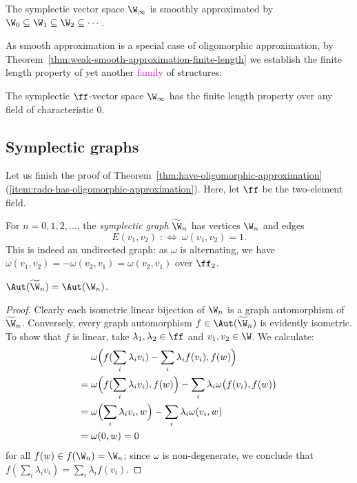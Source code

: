 \begin{theorem}\label{thm:symplectic-smooth-approximation}
    The symplectic vector space $\W_\infty$ is smoothly approximated by 
    $\W_0 \subseteq \W_1 \subseteq \W_2 \subseteq \cdots$.
\end{theorem}

As smooth approximation is a special case of oligomorphic approximation, 
by Theorem~\ref{thm:weak-smooth-approximation-finite-length} we establish the finite length property of yet another \textcolor{magenta}{family} of structures:
\begin{corollary}
    The symplectic $\ff$-vector space $\W_\infty$ has the finite length property over any field of characteristic $0$.
\end{corollary}




\subsection{Symplectic graphs}
Let us finish the proof of Theorem~\ref{thm:have-oligomorphic-approximation}(\ref{item:rado-has-oligomorphic-approximation}).
Here, let $\ff$ be the two-element field.
\begin{definition}
    For $n = 0, 1, 2, \ldots$, the \emph{symplectic graph} $\widetilde \W_n$ has vertices $\W_n$ and edges
    \[
        E(v_1, v_2) \;:\Longleftrightarrow\; \omega(v_1, v_2) = 1.
    \]
    This is indeed an undirected graph: as $\omega$ is alternating, we have $\omega(v_1, v_2) = -\omega(v_2, v_1) = \omega(v_2, v_1)$ over $\ff_2$.
\end{definition}

\begin{proposition}\label{prop:symplectic-vs-graph}
    $\Aut(\widetilde \W_n) = \Aut(\W_n)$.
\end{proposition}
\begin{proof}
    Clearly each isometric linear bijection of $\W_n$ is a graph automorphism of $\widetilde \W_n$.
    Conversely, every graph automorphism $f \in \Aut(\widetilde \W_n)$ is evidently isometric.
    To show that $f$ is linear, take $\lambda_1, \lambda_2 \in \ff$ and $v_1, v_2 \in \W$.
    We calculate:
    \begin{align*}
        &\omega\Bigl( f(\sum_i \lambda_i v_i) - \sum_i \lambda_i f(v_i) , f(w) \Bigr) \\
        ={}& \omega\Bigl( f(\sum_i \lambda_i v_i), f(w)\Bigr) - \sum_i \lambda_i \omega\bigl(f(v_i), f(w) \bigr) \\
        ={}& \omega\Bigl( \sum_i \lambda_i v_i, w \Bigr) - \sum_i \lambda_i \omega( v_i, w ) \\
        ={}& \omega(0, w) = 0
    \end{align*}
    for all $f(w) \in f(\W_n) = \W_n$;
    since $\omega$ is non-degenerate, 
    we conclude that $f(\sum_i \lambda_i v_i) = \sum_i \lambda_i f(v_i)$.
\end{proof}

